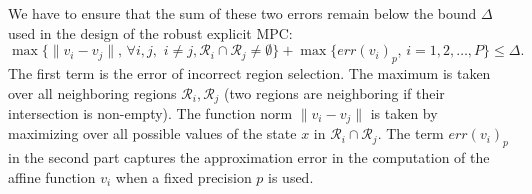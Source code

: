 We have to ensure that the sum of these two errors remain below the bound $\Delta$
used in the design of the robust explicit MPC:
\begin{equation}
  \max\{\|v_{i}-v_{j}\|,\,\forall i,j,\,\, i\neq j, \mathcal{R}_{i}\cap\mathcal{R}_{j}\neq\emptyset\} +  \max\{\mathit{err}(v_{i})_{p},\, i=1,2,\ldots,P\} \le \Delta.
  \label{eq:delta}
\end{equation}
The first term is the error of incorrect region selection. The maximum is taken over all neighboring regions 
$\mathcal R_i,\mathcal R_j$ (two regions are neighboring if their intersection is non-empty).
The function norm $\|v_{i}-v_{j}\|$ is taken by maximizing over all possible values of the state $x$ %
in $\mathcal{R}_i \cap \mathcal{R}_j$. %
The term $\mathit{err}(v_{i})_{p}$ in
the second part captures the approximation error in the computation of the affine function $v_{i}$ when a fixed precision $p$ is used.

